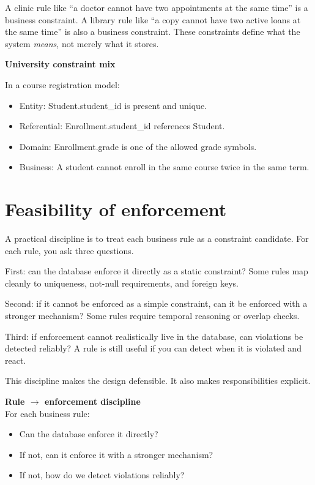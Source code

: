 A clinic rule like “a doctor cannot have two appointments at the same time” is a business constraint.
A library rule like “a copy cannot have two active loans at the same time” is also a business constraint.
These constraints define what the system \emph{means}, not merely what it stores.

\begin{examplebox}
\textbf{University constraint mix}\par\smallskip
In a course registration model:
\begin{itemize}[leftmargin=*,nosep]
  \item Entity: Student.student\_id is present and unique.
  \item Referential: Enrollment.student\_id references Student.
  \item Domain: Enrollment.grade is one of the allowed grade symbols.
  \item Business: A student cannot enroll in the same course twice in the same term.
\end{itemize}
\end{examplebox}

\section{Feasibility of enforcement}
A practical discipline is to treat each business rule as a constraint candidate.
For each rule, you ask three questions.

First: can the database enforce it directly as a static constraint?
Some rules map cleanly to uniqueness, not-null requirements, and foreign keys.

Second: if it cannot be enforced as a simple constraint, can it be enforced with a stronger mechanism?
Some rules require temporal reasoning or overlap checks.

Third: if enforcement cannot realistically live in the database, can violations be detected reliably?
A rule is still useful if you can detect when it is violated and react.

This discipline makes the design defensible.
It also makes responsibilities explicit.

\begin{principlebox}
\textbf{Rule \(\rightarrow\) enforcement discipline}\\[2pt]
For each business rule:
\begin{itemize}[leftmargin=*,nosep]
  \item Can the database enforce it directly?
  \item If not, can it enforce it with a stronger mechanism?
  \item If not, how do we detect violations reliably?
\end{itemize}
\end{principlebox}

